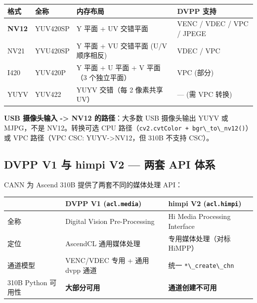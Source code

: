 \begin{longtable}[]{@{}
  >{\raggedright\arraybackslash}p{}
  >{\raggedright\arraybackslash}p{}
  >{\raggedright\arraybackslash}p{}
  >{\raggedright\arraybackslash}p{}@{}}
\toprule\noalign{}
\begin{minipage}[b]{\linewidth}\raggedright
格式
\end{minipage} & \begin{minipage}[b]{\linewidth}\raggedright
全称
\end{minipage} & \begin{minipage}[b]{\linewidth}\raggedright
内存布局
\end{minipage} & \begin{minipage}[b]{\linewidth}\raggedright
DVPP 支持
\end{minipage} \\
\midrule\noalign{}
\endhead
\bottomrule\noalign{}
\endlastfoot
\textbf{NV12} & YUV420SP & Y 平面 + UV 交错平面 & VENC / VDEC / VPC /
JPEGE \\
NV21 & YVU420SP & Y 平面 + VU 交错平面 (U/V 顺序相反) & VDEC / VPC \\
I420 & YUV420P & Y 平面 + U 平面 + V 平面（3 个独立平面） & VPC
(部分) \\
YUYV & YUV422 & YUYV 交错（每 2 像素共享 UV） & --- (需 VPC 转换) \\
\end{longtable}

\textbf{USB 摄像头输入 -\textgreater{} NV12 的路径}：大多数 USB
摄像头输出 YUYV 或 MJPG，不是 NV12。转换可选 CPU
路径（\passthrough{\lstinline!cv2.cvtColor + bgr\_to\_nv12()!}）或 VPC
路径（VPC CSC: YUYV-\textgreater NV12，但 310B 不支持 CSC）。

\subsection{DVPP V1 与 himpi V2 --- 两套 API
体系}\label{src-book-chapter6-h6}

CANN 为 Ascend 310B 提供了两套不同的媒体处理 API：

\begin{longtable}[]{@{}lll@{}}
\toprule\noalign{}
& DVPP V1 (\passthrough{\lstinline!acl.media!}) & himpi V2
(\passthrough{\lstinline!acl.himpi!}) \\
\midrule\noalign{}
\endhead
\bottomrule\noalign{}
\endlastfoot
全称 & Digital Vision Pre-Processing & Hi Media Processing Interface \\
定位 & AscendCL 通用媒体处理 & 专用媒体处理（对标 HiMPP） \\
通道模型 & VENC/VDEC 专用 + 通用 dvpp 通道 & 统一
\passthrough{\lstinline!*\_create\_chn!} \\
310B Python 可用性 & \textbf{大部分可用} & \textbf{通道创建不可用} \\
\end{longtable}

